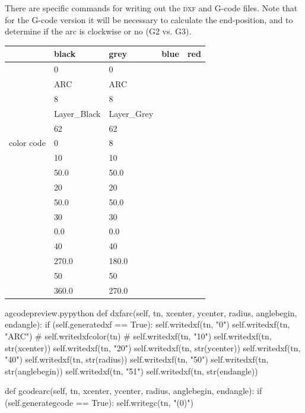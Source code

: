 \documentclass{ltxdoc}
\begin{document}
There are specific commands for writing out the \textsc{dxf} and G-code files. Note that for the G-code version it will be necessary to calculate the end-position, and to determine if the arc is clockwise or no (G2 vs. G3).

\begin{center}
\noindent\begin{tabular}{lllll}
           & black & grey & blue & red \\
\toprule
& 0            & 0 \\
& ARC          & ARC \\ 
& 8            & 8 \\
& Layer\_Black & Layer\_Grey\\
& 62           & 62 \\
color code & 0            & 8 \\
& 10           & 10 \\
& 50.0         & 50.0 \\
& 20           & 20 \\
& 50.0         & 50.0 \\
& 30           & 30 \\
& 0.0          & 0.0 \\
& 40           & 40 \\
& 270.0        & 180.0 \\
& 50           & 50 \\
& 360.0        & 270.0\\\bottomrule
\end{tabular}
\end{center}

\lstset{firstnumber=\thegcpy}
\begin{writecode}{a}{gcodepreview.py}{python}
    def dxfarc(self, tn, xcenter, ycenter, radius, anglebegin, endangle):
        if (self.generatedxf == True):
            self.writedxf(tn, "0")
            self.writedxf(tn, "ARC")
#
            self.writedxfcolor(tn)
#
            self.writedxf(tn, "10")
            self.writedxf(tn, str(xcenter))
            self.writedxf(tn, "20")
            self.writedxf(tn, str(ycenter))
            self.writedxf(tn, "40")
            self.writedxf(tn, str(radius))
            self.writedxf(tn, "50")
            self.writedxf(tn, str(anglebegin))
            self.writedxf(tn, "51")
            self.writedxf(tn, str(endangle))

    def gcodearc(self, tn, xcenter, ycenter, radius, anglebegin, endangle):
        if (self.generategcode == True):
            self.writegc(tn, "(0)")

\end{writecode}
\addtocounter{gcpy}{22}
\end{document}
